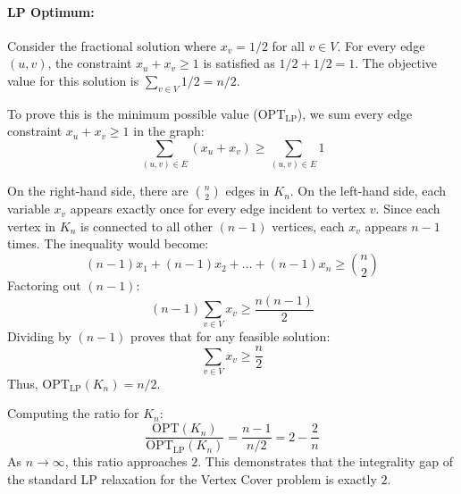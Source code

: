 \documentclass[11pt,a4paper]{article}
\begin{document}
\paragraph{LP Optimum:} Consider the fractional solution where $x_v = 1/2$ for all $v \in V$. For every edge $(u,v)$, the constraint $x_u + x_v \geq 1$ is satisfied as $1/2 + 1/2 = 1$. The objective value for this solution is $\sum_{v \in V} 1/2 = n/2$. 

To prove this is the minimum possible value ($\text{OPT}_{\text{LP}}$), we sum every edge constraint $x_u + x_v \geq 1$ in the graph:
\begin{equation}
    \sum_{(u,v) \in E} (x_u + x_v) \geq \sum_{(u,v) \in E} 1
\end{equation}

On the right-hand side, there are $\binom{n}{2}$ edges in $K_n$. On the left-hand side, each variable $x_v$ appears exactly once for every edge incident to vertex $v$. Since each vertex in $K_n$ is connected to all other $(n-1)$ vertices, each $x_v$ appears $n-1$ times. The inequality would become:
\begin{equation}
    (n-1)x_1 + (n-1)x_2 + \dots + (n-1)x_n \geq \binom{n}{2}
\end{equation}
Factoring out $(n-1)$:
\begin{equation}
    (n-1) \sum_{v \in V} x_v \geq \frac{n(n-1)}{2}
\end{equation}
Dividing by $(n-1)$ proves that for any feasible solution:
\begin{equation}
    \sum_{v \in V} x_v \geq \frac{n}{2}
\end{equation}
Thus, $\text{OPT}_{\text{LP}}(K_n) = n/2$.

Computing the ratio for $K_n$:
\begin{equation}
    \frac{\text{OPT}(K_n)}{\text{OPT}_{\text{LP}}(K_n)} = \frac{n-1}{n/2} = 2 - \frac{2}{n}
\end{equation}
As $n \to \infty$, this ratio approaches $2$. This demonstrates that the integrality gap of the standard LP relaxation for the Vertex Cover problem is exactly $2$. 
\end{document}
